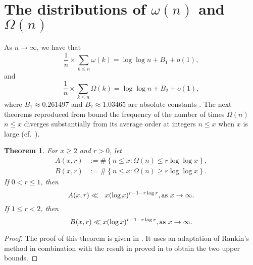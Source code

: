 \documentclass[11pt,reqno,a4letter]{article}
\numberwithin{equation}{section}
\numberwithin{figure}{section}
\numberwithin{table}{section}
\newcommand{\cf}{cf.~}
\theoremstyle{plain}
\newtheorem{theorem}{Theorem}
\numberwithin{theorem}{section}
\theoremstyle{definition}
\theoremstyle{remark}
\newcommand{\mathtext}[1]{\text{\rm #1}}
\begin{document}
\appendix
{}
\setcounter{section}{0} 
\renewcommand{\thesection}{\Alph{section}} 

\newpage
%

\section{The distributions of $\omega(n)$ and $\Omega(n)$} 
\label{subSection_TheKnownDistsOfThePrimeOmegaFunctions_IntroResults_v1} 

As $n \rightarrow \infty$, we have that 
$$\frac{1}{n} \times \sum_{k \leq n} \omega(k) = \log\log n + B_1 + o(1),$$ 
and 
$$\frac{1}{n} \times \sum_{k \leq n} \Omega(k) = \log\log n + B_2 + o(1),$$ 
where $B_1 \approx 0.261497$ and $B_2 \approx 1.03465$ are 
absolute constants \cite[\S 22.10]{HARDYWRIGHT}. 
The next theorems reproduced from \cite[\S 7.4]{MV} bound the frequency of the 
number of times $\Omega(n)$ $n \leq x$ 
diverges substantially from its average order at integers $n \leq x$ 
when $x$ is large 
(\cf \cite{ERDOS-KAC-REF,BILLINGSLY-CLT-PRIMEDIVFUNC}). 

\begin{theorem} 
\label{theorem_MV_Thm7.20-init_stmt} 
For $x \geq 2$ and $r > 0$, let 
\begin{align*} 
A(x, r) & := \#\left\{n \leq x: \Omega(n) \leq r \log\log x\right\}, \\ 
B(x, r) & := \#\left\{n \leq x: \Omega(n) \geq r \log\log x\right\}. 
\end{align*} 
If $0 < r \leq 1$, then 
\[
A(x, r) \ll\phantom{_R} x (\log x)^{r-1 - r\log r}, \mathtext{ as } x \rightarrow \infty. 
\]
If $1 \leq r < 2$, then 
\[
B(x, r) \ll x (\log x)^{r-1-r \log r}, \mathtext{ as } x \rightarrow \infty. 
\]
\end{theorem} 
\begin{proof}
The proof of this theorem is given in \cite[Thm.~7.20; \S 7.4]{MV}. 
It uses an adaptation of Rankin's method in combination with the result 
in proved in \cite[Thm.~7.18; \S 7.4]{MV} to obtain the two upper bounds. 
\end{proof}
\end{document}
